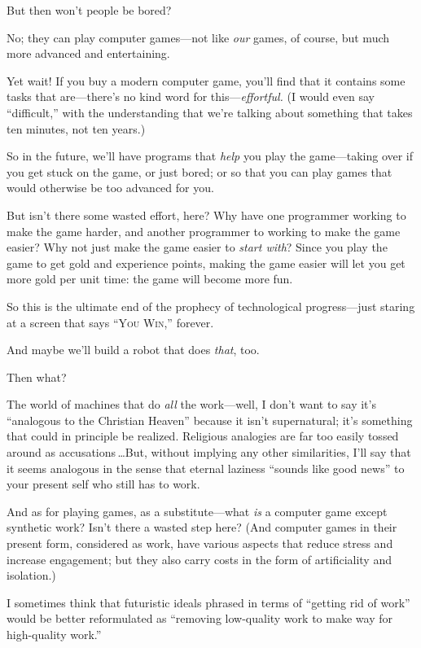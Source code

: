  But then won't people be bored?


 No; they can play computer games---not like \textit{our} games, of
course, but much more advanced and entertaining.


 Yet wait! If you buy a modern computer game,
you'll find that it contains some tasks that
are---there's no kind word for
this---\textit{effortful.} (I would even say
``difficult,'' with the
understanding that we're talking about something that
takes ten minutes, not ten years.)


 So in the future, we'll have programs that
\textit{help} you play the game---taking over if you get stuck on the
game, or just bored; or so that you can play games that would otherwise
be too advanced for you.


 But isn't there some wasted effort, here? Why have
one programmer working to make the game harder, and another programmer
to working to make the game easier? Why not just make the game easier
to \textit{start with}? Since you play the game to get gold and
experience points, making the game easier will let you get more gold
per unit time: the game will become more fun.

{
 So this is the ultimate end of the prophecy of technological
progress---just staring at a screen that says ``\textsc{You
Win},'' forever.}


 And maybe we'll build a robot that does
\textit{that}, too.


 Then what?


 The world of machines that do \textit{all} the work---well, I
don't want to say it's
``analogous to the Christian
Heaven'' because it isn't
supernatural; it's something that could in principle be
realized. Religious analogies are far too easily tossed around as
accusations\,\ldots But, without implying any other similarities,
I'll say that it seems analogous in the sense that
eternal laziness ``sounds like good
news'' to your present self who still has to work.


 And as for playing games, as a substitute---what \textit{is} a
computer game except synthetic work? Isn't there a
wasted step here? (And computer games in their present form, considered
as work, have various aspects that reduce stress and increase
engagement; but they also carry costs in the form of artificiality and
isolation.)


 I sometimes think that futuristic ideals phrased in terms of
``getting rid of work'' would be
better reformulated as ``removing low-quality work to
make way for high-quality work.''


